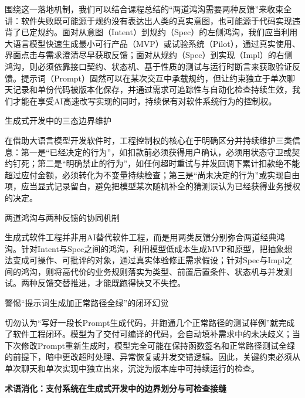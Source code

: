 \documentclass[UTF8,a4paper,11pt,fontset=fandol]{ctexart}
\begin{document}
围绕这一落地机制，我们可以结合课程总结的“两道鸿沟需要两种反馈”来收束全讲：软件失败既可能源于规约没有表达出人类的真实意图，也可能源于代码实现违背了已定规约。面对从意图（Intent）到规约（Spec）的左侧鸿沟，我们应当利用大语言模型快速生成最小可行产品（MVP）或试验系统（Pilot），通过真实使用、界面点击与需求澄清尽早获取反馈；面对从规约（Spec）到实现（Impl）的右侧鸿沟，则必须依靠接口契约、状态机、基于性质的测试与运行时断言来获取验证反馈。提示词（Prompt）固然可以在某次交互中承载规约，但让约束独立于单次聊天记录和单份代码被版本化保存，并通过需求可追踪性与自动化检查持续生效，我们才能在享受AI高速改写实现的同时，持续保有对软件系统行为的控制权。

\begin{importantbox}{生成式开发中的三态边界维护}

在借助大语言模型开发软件时，工程控制权的核心在于明确区分并持续维护三类信息：第一是“已经决定的行为”，如扣款前必须获得用户确认，必须用状态守卫或契约钉死；第二是“明确禁止的行为”，如任何超时重试与并发回调下累计扣款绝不能超过应付金额，必须转化为不变量持续检查；第三是“尚未决定的行为”或实现自由项，应当显式记录留白，避免把模型某次随机补全的猜测误认为已经获得业务授权的决定。

\end{importantbox}

\begin{knowledgebox}{两道鸿沟与两种反馈的协同机制}

生成式软件工程并非用AI替代软件工程，而是用两类反馈分别弥合两道经典鸿沟。针对Intent与Spec之间的鸿沟，利用模型低成本生成MVP和原型，把抽象想法变成可操作、可批评的对象，通过真实体验修正需求假设；针对Spec与Impl之间的鸿沟，则将高代价的业务规则落实为类型、前置后置条件、状态机与并发测试。两种反馈交替推进，才能既跑得快又不失控。

\end{knowledgebox}

\begin{warningbox}{警惕“提示词生成加正常路径全绿”的闭环幻觉}

切勿认为“写好一段长Prompt生成代码，并跑通几个正常路径的测试样例”就完成了软件工程闭环。模型为了交付可编译的代码，会自动填补需求中的未决歧义；当下次修改Prompt重新生成时，模型完全可能在保持函数签名和正常路径测试全绿的前提下，暗中更改超时处理、异常恢复或并发交错逻辑。因此，关键约束必须从单次聊天和单次实现中独立出来，沉淀为版本库中可持续运行的检查。

\end{warningbox}

\par{}\textbf{术语消化：支付系统在生成式开发中的边界划分与可检查接缝}
\end{document}
